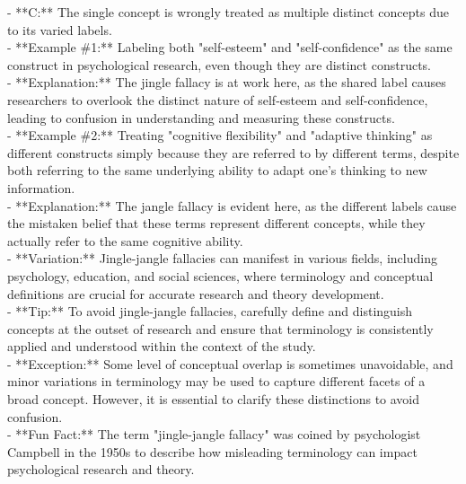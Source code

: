 \documentclass[a4paper,12pt,single,pdftex]{scrartcl}
\begin{document}
    
          - **C:** The single concept is wrongly treated as multiple distinct concepts due to its varied labels.
    \\

    
      - **Example \#1:** Labeling both "self-esteem" and "self-confidence" as the same construct in psychological research, even though they are distinct constructs.
    \\

    
      - **Explanation:** The jingle fallacy is at work here, as the shared label causes researchers to overlook the distinct nature of self-esteem and self-confidence, leading to confusion in understanding and measuring these constructs.
    \\

    
      - **Example \#2:** Treating "cognitive flexibility" and "adaptive thinking" as different constructs simply because they are referred to by different terms, despite both referring to the same underlying ability to adapt one's thinking to new information.
    \\

    
      - **Explanation:** The jangle fallacy is evident here, as the different labels cause the mistaken belief that these terms represent different concepts, while they actually refer to the same cognitive ability.
    \\

    
      - **Variation:** Jingle-jangle fallacies can manifest in various fields, including psychology, education, and social sciences, where terminology and conceptual definitions are crucial for accurate research and theory development.
    \\

    
      - **Tip:** To avoid jingle-jangle fallacies, carefully define and distinguish concepts at the outset of research and ensure that terminology is consistently applied and understood within the context of the study.
    \\

    
      - **Exception:** Some level of conceptual overlap is sometimes unavoidable, and minor variations in terminology may be used to capture different facets of a broad concept. However, it is essential to clarify these distinctions to avoid confusion.
    \\

    
      - **Fun Fact:** The term "jingle-jangle fallacy" was coined by psychologist Campbell in the 1950s to describe how misleading terminology can impact psychological research and theory.
    \\
\end{document}
